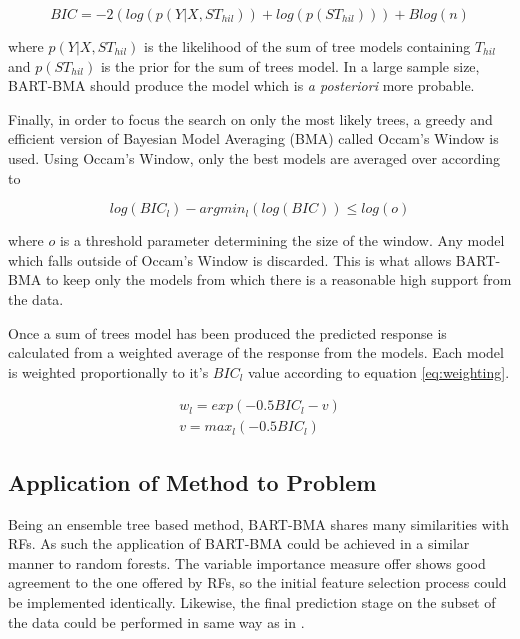 \documentclass[journal]{IEEEtran}
\begin{document}
\begin{equation}
	BIC = -2(log(p(Y|X,ST_{hil})) + log(p(ST_{hil}))) + B log(n)
\end{equation}

where $p(Y|X,ST_{hil})$ is the likelihood of the sum of tree models containing $T_{hil}$ and $p(ST_{hil})$ is the prior for the sum of trees model. In a large sample size, BART-BMA should produce the model which is \textit{a posteriori} more probable.

Finally, in order to focus the search on only the most likely trees, a greedy and efficient version of Bayesian Model Averaging (BMA) called Occam's Window is used. Using Occam's Window, only the best models are averaged over according to

\begin{equation}
	log(BIC_l) - argmin_l(log(BIC)) \leq log(o)
\end{equation}

where $o$ is a threshold parameter determining the size of the window. Any model which falls outside of Occam's Window is discarded. This is what allows BART-BMA to keep only the models from which there is a reasonable high support from the data.

Once a sum of trees model has been produced the predicted response is calculated from a weighted average of the response from the models. Each model is weighted proportionally to it's $BIC_l$ value according to equation \ref{eq:weighting}.

\begin{equation}
\label{eq:weighting}
\begin{split}
	w_l = exp(-0.5 BIC_l - v)\\
	v = max_l(-0.5 BIC_l)
\end{split}
\end{equation}

\subsection{Application of Method to Problem}
Being an ensemble tree based method, BART-BMA shares many similarities with RFs. As such the application of BART-BMA could be achieved in a similar manner to random forests. The variable importance measure offer shows good agreement to the one offered by RFs, so the initial feature selection process could be implemented identically. Likewise, the final prediction stage on the subset of the data could be performed in same way as in \cite{riddick2011predicting}.
\end{document}

